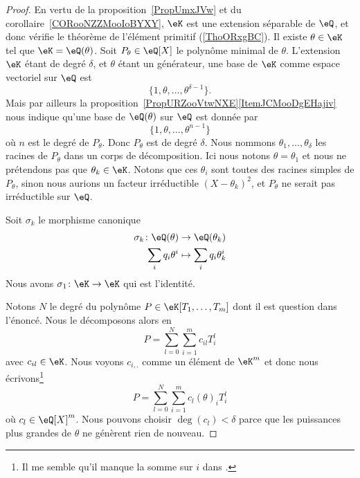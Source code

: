 \begin{proof}
    En vertu de la proposition~\ref{PropUmxJVw} et du corollaire~\ref{CORooNZZMooIoBYXY}, \( \eK\) est une extension séparable de \( \eQ\), et donc vérifie le théorème de l'élément primitif (\ref{ThoORxgBC}). Il existe \( \theta\in \eK\) tel que \( \eK=\eQ(\theta)\). Soit \( P_{\theta}\in\eQ[X]\) le polynôme minimal de \( \theta\). L'extension \( \eK\) étant de degré \( \delta\), et \( \theta\) étant un générateur, une base de \( \eK\) comme espace vectoriel sur \( \eQ\) est
    \begin{equation}
        \{ 1,\theta,\ldots, \theta^{\delta-1} \}.
    \end{equation}
    Mais par ailleurs la proposition~\ref{PropURZooVtwNXE}\ref{ItemJCMooDgEHajiv} nous indique qu'une base de \( \eQ(\theta)\) sur \( \eQ\) est donnée par
    \begin{equation}
        \{ 1,\theta,\ldots, \theta^{n-1} \}
    \end{equation}
    où \( n\) est le degré de \( P_{\theta}\). Donc \( P_{\theta}\) est de degré \( \delta\). Nous nommons \( \theta_1,\ldots, \theta_{\delta}\) les racines de \( P_{\theta}\) dans un corps de décomposition. Ici nous notons \( \theta=\theta_1\) et nous ne prétendons pas que \( \theta_k\in \eK\). Notons que ces \( \theta_i\) sont toutes des racines simples de \( P_{\theta}\), sinon nous aurions un facteur irréductible \( (X-\theta_k)^2\), et \( P_{\theta}\) ne serait pas irréductible sur \( \eQ\).

    Soit \( \sigma_k\) le morphisme canonique
    \begin{equation}
        \begin{aligned}
            \sigma_k\colon \eQ(\theta)&\to \eQ(\theta_k) \\
            \sum_i q_i\theta^i&\mapsto \sum_iq_i\theta_k^i
        \end{aligned}
    \end{equation}
    Nous avons \( \sigma_1\colon \eK\to \eK\) qui est l'identité.

    Notons \( N\) le degré du polynôme \( P\in \eK[T_1,\ldots, T_m]\) dont il est question dans l'énoncé. Nous le décomposons alors en
    \begin{equation}
        P=\sum_{l=0}^N\sum_{i=1}^mc_{il}T_i^l
    \end{equation}
    avec \( c_{il}\in \eK\). Nous voyons \( c_{i,.}\) comme un élément de \( \eK^m\) et donc nous écrivons\footnote{Il me semble qu'il manque la somme sur \( i\) dans \cite{fJhCTE}.}
    \begin{equation}
        P=\sum_{l=0}^N\sum_{i=1}^m c_l(\theta)_iT_i^l
    \end{equation}
    où \( c_l\in \eQ[X]^m\). Nous pouvons choisir \( \deg(c_l)<\delta\) parce que les puissances plus grandes de \( \theta\) ne génèrent rien de nouveau.


\end{proof}

